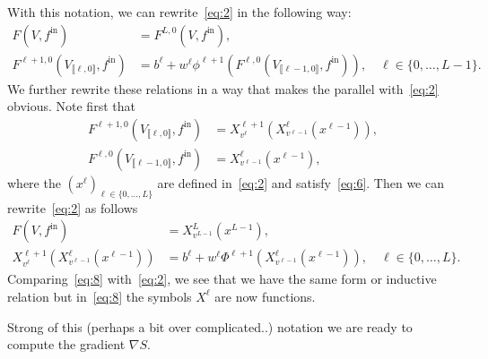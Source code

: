 \documentclass[10pt, a4paper]{article}
\theoremstyle{plain}
\theoremstyle{definition}
\theoremstyle{definition}
\theoremstyle{definition}
\theoremstyle{definition}
\theoremstyle{definition}
\theoremstyle{definition}
\theoremstyle{definition}
\theoremstyle{remark}
\theoremstyle{remark}
\theoremstyle{rudin-style-generic}
\theoremstyle{rudin-style-generic*}
\theoremstyle{rudin-style-theorem}
\newcommand*{\fin}{{f^{\text{in}}}}
\begin{document}
  With this notation, we can rewrite~\eqref{eq:2} in the following way:
  \begin{equation}
    \label{eq:7}
    \begin{aligned}
      F(V,f^{\text{in}}) &= F^{L,0}(V, f^{\text{in}})  , \\
      F^{\ell+1,0}( V_{\llbracket \ell,0\rrbracket} , f^{\text{in}}  )
                         &= b^\ell + w^\ell \phi^{\ell+1}( F^{\ell,0}( V_{\llbracket \ell-1,0\rrbracket} , f^{\text{in}}) ) ,
                           \quad \ell\in\{0,\dots, L-1\} 
                           .
    \end{aligned}
  \end{equation}
  We further rewrite these relations in a way that makes the parallel with~\eqref{eq:2} obvious.
  Note first that
  \begin{align*}
    F^{\ell+1,0}( V_{\llbracket \ell ,0\rrbracket}, \fin )
    &= X^{\ell+1}_{v^\ell} ( X^\ell_{v^{\ell-1}} ( x^{\ell-1} ) ), \\
    F^{\ell,0}(  V_{\llbracket \ell-1 ,0\rrbracket}, \fin )
    &= X^{\ell}_{v^{\ell-1}}( x^{\ell-1} ) 
        ,
  \end{align*}
  where the $(x^\ell)_{\ell\in\{0,\dots,L\}}$ are defined in~\eqref{eq:2} and satisfy~\eqref{eq:6}.
  Then we can rewrite~\eqref{eq:2} as follows
  \begin{equation}
    \label{eq:8}
    \begin{aligned}
      F(V,\fin) &=  X^{L}_{v^{L-1}}(  x^{L-1} ), \\
      X^{\ell+1}_{v^\ell}( X^\ell_{v^{\ell-1}} ( x^{\ell-1} ) )
                         &=  b^\ell + w^\ell  \Phi^{\ell+1} ( X^{\ell}_{v^{\ell-1}} ( x^{\ell-1} ) ),
                           \quad \ell\in\{0,\dots, L\} 
                           .
    \end{aligned}
  \end{equation}
  Comparing~\eqref{eq:8} with~\eqref{eq:2}, we see that we have the same form or inductive relation but in~\eqref{eq:8} the symbols
  $X^{\ell}$ are now functions.

  Strong of this (perhaps a bit over complicated..) notation we are ready to compute the gradient $\nabla S$.
\end{document}
